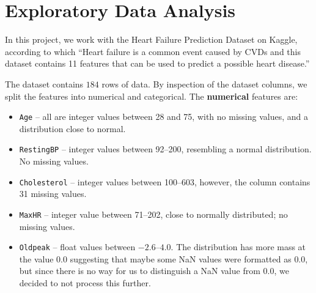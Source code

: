\section{Exploratory Data Analysis}

In this project, we work with the Heart Failure Prediction Dataset \cite{HeartFailurePrediction} on Kaggle, according to which ``Heart failure is a common event caused by CVDs and this dataset contains 11 features that can be used to predict a possible heart disease.''

The dataset contains $184$ rows of data. By inspection of the dataset columns, we split the features into numerical and categorical. The \textbf{numerical} features are:
\begin{itemize}
    \item \texttt{Age} -- all are integer values between 28 and 75, with no missing values, and a distribution close to normal.
    \item \texttt{RestingBP} -- integer values between 92--200, resembling a normal distribution. No missing values.
    \item \texttt{Cholesterol} -- integer values between 100--603, however, the column contains 31 missing values.
    \item \texttt{MaxHR} -- integer value between 71--202, close to normally distributed; no missing values.
    \item \texttt{Oldpeak} -- float values between $-2.6$--$4.0$. The distribution has more mass at the value $0.0$ suggesting that maybe some NaN values were formatted as $0.0$, but since there is no way for us to distinguish a NaN value from $0.0$, we decided to not process this further.
\end{itemize}
